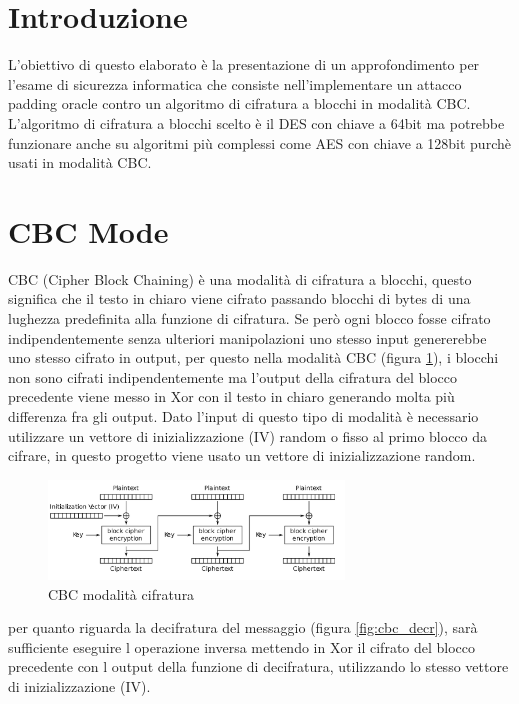 \section{Introduzione}
L'obiettivo di questo elaborato è la presentazione di un approfondimento per l'esame di sicurezza informatica che consiste nell'implementare 
un attacco padding oracle contro un algoritmo di cifratura a blocchi in modalità CBC.
L'algoritmo di cifratura a blocchi scelto è il DES con chiave a 64bit ma potrebbe funzionare anche 
su algoritmi più complessi come AES con chiave a 128bit purchè usati in modalità CBC.
\section{CBC Mode}

CBC (Cipher Block Chaining) è una modalità di cifratura a blocchi, questo significa che il testo in chiaro viene cifrato passando blocchi di bytes di una 
lughezza predefinita alla funzione di cifratura. Se però ogni blocco fosse cifrato indipendentemente senza ulteriori manipolazioni uno stesso 
input genererebbe uno stesso cifrato in output, per questo nella modalità CBC (figura \ref{fig:cbc_enc}), i blocchi non sono cifrati indipendentemente ma 
l'output della cifratura del blocco precedente viene messo in Xor con il testo in chiaro generando molta più differenza fra gli output.
Dato l'input di questo tipo di modalità è necessario utilizzare un vettore di inizializzazione (IV) random o fisso al primo blocco da cifrare, in questo progetto viene usato 
un vettore di inizializzazione random.

\begin{figure}[h!]
    \includegraphics[width=0.7\textwidth]{img/CBC_encr.png}
    \centering
    \caption{CBC modalità cifratura}
    \label{fig:cbc_enc}
\end{figure}

per quanto riguarda la decifratura del messaggio (figura \ref{fig:cbc_decr}), sarà sufficiente eseguire l operazione inversa mettendo in Xor il cifrato del blocco precedente con l output della funzione di decifratura, 
utilizzando lo stesso vettore di inizializzazione (IV).

